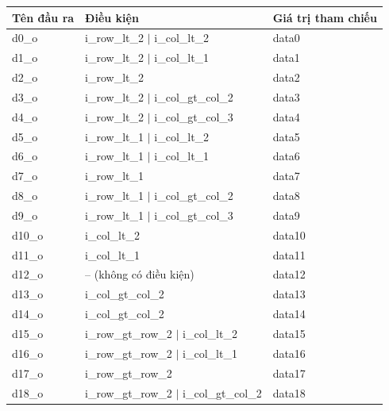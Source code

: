 \begin{table}[!ht]
    \centering
    \renewcommand{\arraystretch}{1.4}
    \begin{tabular}{|p{2.2cm} p{7cm} p{4cm}|}
        \hline
        \rowcolor{gray!30}
        \textbf{Tên đầu ra} & \textbf{Điều kiện} & \textbf{Giá trị tham chiếu} \\
        \hline
        d0\_o  & i\_row\_lt\_2 $\vert$ i\_col\_lt\_2         & data0  \\ \hline
        d1\_o  & i\_row\_lt\_2 $\vert$ i\_col\_lt\_1         & data1  \\ \hline
        d2\_o  & i\_row\_lt\_2                                & data2  \\ \hline
        d3\_o  & i\_row\_lt\_2 $\vert$ i\_col\_gt\_col\_2     & data3  \\ \hline
        d4\_o  & i\_row\_lt\_2 $\vert$ i\_col\_gt\_col\_3     & data4  \\ \hline
        d5\_o  & i\_row\_lt\_1 $\vert$ i\_col\_lt\_2         & data5  \\ \hline
        d6\_o  & i\_row\_lt\_1 $\vert$ i\_col\_lt\_1         & data6  \\ \hline
        d7\_o  & i\_row\_lt\_1                                & data7  \\ \hline
        d8\_o  & i\_row\_lt\_1 $\vert$ i\_col\_gt\_col\_2     & data8  \\ \hline
        d9\_o  & i\_row\_lt\_1 $\vert$ i\_col\_gt\_col\_3     & data9  \\ \hline
        d10\_o & i\_col\_lt\_2                                & data10 \\ \hline
        d11\_o & i\_col\_lt\_1                                & data11 \\ \hline
        d12\_o & -- (không có điều kiện)                     & data12 \\ \hline
        d13\_o & i\_col\_gt\_col\_2                           & data13 \\ \hline
        d14\_o & i\_col\_gt\_col\_2                           & data14 \\ \hline
      d15\_o & i\_row\_gt\_row\_2 $\vert$ i\_col\_lt\_2     & data15 \\ \hline
      d16\_o & i\_row\_gt\_row\_2 $\vert$ i\_col\_lt\_1     & data16 \\ \hline
      d17\_o & i\_row\_gt\_row\_2                           & data17 \\ \hline
      d18\_o & i\_row\_gt\_row\_2 $\vert$ i\_col\_gt\_col\_2 & data18 \\ \hline

\end{tabular}
\end{table}
